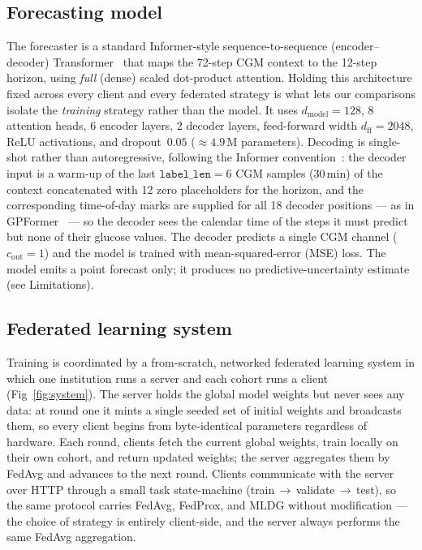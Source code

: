 \documentclass[10pt,letterpaper]{article}
\begin{document}
\subsection*{Forecasting model}

The forecaster is a standard Informer-style sequence-to-sequence
(encoder--decoder) Transformer~\cite{zhou2021informer} that maps
the 72-step CGM context to the 12-step horizon, using \emph{full}
(dense) scaled dot-product attention.
Holding this architecture fixed across every client and every federated
strategy is what lets our comparisons isolate the \emph{training} strategy rather
than the model. It uses
$d_{\text{model}}=128$, 8 attention heads, 6 encoder layers, 2 decoder layers,
feed-forward width $d_{\text{ff}}=2048$, ReLU activations, and dropout~$0.05$
($\approx 4.9$\,M parameters). Decoding is single-shot rather than
autoregressive, following the Informer convention~\cite{zhou2021informer}: the
decoder input is a warm-up of the last $\texttt{label\_len}=6$ CGM samples
(30\,min) of the context concatenated with 12 zero placeholders for the horizon,
and the corresponding time-of-day marks are supplied for all 18 decoder
positions --- as in GPFormer~\cite{zhu2024gpformer} --- so the decoder sees the
calendar time of the steps it must predict but
none of their glucose values. The decoder predicts a single CGM channel ($c_{\text{out}}=1$) and the
model is trained with mean-squared-error (MSE) loss. The model emits a point
forecast only; it produces no predictive-uncertainty estimate (see Limitations).

\subsection*{Federated learning system}

Training is coordinated by a from-scratch, networked federated learning system
in which one institution runs a server and each cohort runs a client
(Fig~\ref{fig:system}). The server
holds the global model weights but never sees any data: at round one it mints a
single seeded set of initial weights and broadcasts them, so every client begins
from byte-identical parameters regardless of hardware. Each round, clients fetch
the current global weights, train locally on their own cohort, and return updated
weights; the server aggregates them by FedAvg and advances to the next round.
Clients communicate with the server over HTTP through a small task
state-machine (train\,$\rightarrow$\,validate\,$\rightarrow$\,test), so the same
protocol carries FedAvg, FedProx, and MLDG without modification --- the choice of
strategy is entirely client-side, and the server always performs the same FedAvg
aggregation.
\end{document}
